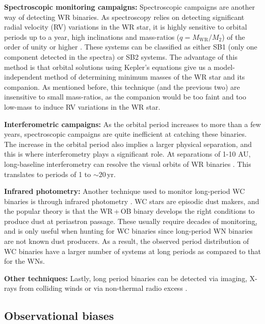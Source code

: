 \textbf{Spectroscopic monitoring campaigns:} Spectroscopic campaigns are another way of detecting WR binaries. As spectroscopy relies on detecting significant radial velocity (RV) variations in the WR star, it is highly sensitive to orbital periods up to a year, high inclinations and mass-ratios ($q=M_\textrm{WR}/M_2$) of the order of unity or higher \citep[see e.g.,][]{1998Marchenko1998WR141,2012David-Uraz,2021Richardson}. These systems can be classified as either SB1 (only one component detected in the spectra) or SB2 systems. The advantage of this method is that orbital solutions using Kepler's equations give us a model-independent method of determining minimum masses of the WR star and its companion. As mentioned before, this technique (and the previous two) are insensitive to small mass-ratios, as the companion would be too faint and too low-mass to induce RV variations in the WR star.

\textbf{Interferometric campaigns:} As the orbital period increases to more than a few years, spectroscopic campaigns are quite inefficient at catching these binaries. The increase in the orbital period also implies a larger physical separation, and this is where interferometry plays a significant role. At separations of 1-10 AU, long-baseline interferometry can resolve the visual orbits of WR binaries \citep[e.g. for WR 113 and WR 140, respectively:][]{2021Richardson,thomas_orbit_2021}. This translates to periods of 1 to ${\sim}20\,$yr.

\textbf{Infrared photometry:} Another technique used to monitor long-period WC binaries is through infrared photometry \citep{1995Williamsdust,1999MarchenkoDust,2001WilliamsDust,2005Williams,2019WilliamsNEOWISE}. WC stars are episodic dust makers, and the popular theory is that the WR\,+\,OB binary develops the right conditions to produce dust at periastron passage. These usually require decades of monitoring\b{, and is only useful when hunting for WC binaries since long-period WN binaries are not known dust producers. As a result, the observed period distribution of WC binaries have a larger number of systems at long periods as compared to that for the WNs.}

\textbf{Other techniques:} Lastly, long period binaries can be detected via imaging, X-rays from colliding winds or via non-thermal radio excess \citep[e.g.][]{1996Dougherty, 2000Dougherty, 2017Zhekov,2020Rodriguez, 2020Zhekov}.

\subsection{Observational biases} \label{sect:obs_bias_intro}

